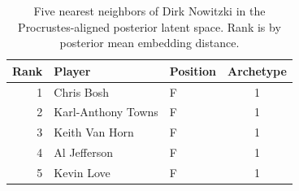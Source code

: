 \begin{table}[htbp]
  \centering\small
  \begin{tabular}{rllc}
    \toprule
    Rank & Player & Position & Archetype \\
    \midrule
    1 & Chris Bosh & F & 1 \\
    2 & Karl-Anthony Towns & F & 1 \\
    3 & Keith Van Horn & F & 1 \\
    4 & Al Jefferson & F & 1 \\
    5 & Kevin Love & F & 1 \\
    \bottomrule
  \end{tabular}
  \caption{Five nearest neighbors of Dirk Nowitzki in the Procrustes-aligned posterior latent space. Rank is by posterior mean embedding distance.}
  \label{tab:Dirk_Nowitzki_neighbors}
\end{table}

